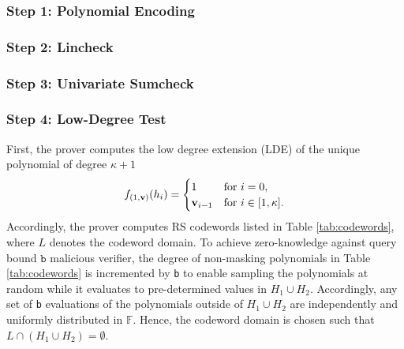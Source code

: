 \subsubsection{Step 1: Polynomial Encoding}


\subsubsection{Step 2: Lincheck}

\subsubsection{Step 3: Univariate Sumcheck}

\subsubsection{Step 4: Low-Degree Test}


First, the prover computes the low degree extension (LDE) of the unique polynomial of degree $\kappa+1$
\begin{equation*}
	f_{(1,{\bf{v}})}(h_i) = \begin{cases}
		1 & \text{for $i = 0$},\\
		{\bf{v}}_{i-1} &  \text{for $i \in [1,\kappa]$}.
	\end{cases}
\end{equation*}
Accordingly, the prover computes RS codewords listed in Table \ref{tab:codewords}, where $L$ denotes the codeword domain. To achieve zero-knowledge against query bound $\texttt{b}$ malicious verifier, the degree of non-masking polynomials in Table \ref{tab:codewords} is incremented by \texttt{b} to enable sampling the polynomials at random while it evaluates to pre-determined values in $H_1 \cup H_2$. Accordingly, any set of \texttt{b} evaluations of the polynomials outside of $H_1 \cup H_2$ are independently and uniformly distributed in $\mathbb{F}$. Hence, the codeword domain is chosen such that  $L \cap (H_1 \cup H_2) = \emptyset$. 

